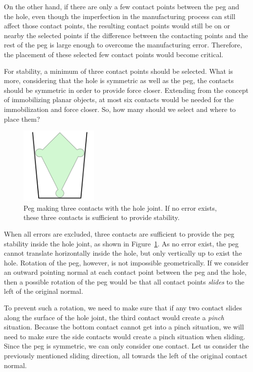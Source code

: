 \documentclass[11pt, twocolumn]{article}
\begin{document}
On the other hand, if there are only a few contact points between the peg and the hole, even though the imperfection in the manufacturing process can still affect those contact points, the resulting contact points would still be on or nearby the selected points if the difference between the contacting points and the rest of the peg is large enough to overcome the manufacturing error. Therefore, the placement of these selected few contact points would become critical. 

For stability, a minimum of three contact points should be selected. What is more, considering that the hole is symmetric as well as the peg, the contacts should be symmetric in order to provide force closer. Extending from the concept of immobilizing planar objects, at most six contacts would be needed for the immobilization and force closer. So, how many should we select and where to place them? 

\begin{figure}
\begin{center}
\includegraphics[width=1.5in]{figures/three_contact.png}
\end{center}
\caption{Peg making three contacts with the hole joint. If no error exists, these three contacts is sufficient to provide stability. }
\label{fig:three_contact}
\end{figure}


When all errors are excluded, three contacts are sufficient to provide the peg stability inside the hole joint, as shown in Figure~\ref{fig:three_contact}. As no error exist, the peg cannot translate horizontally inside the hole, but only vertically up to exist the hole. Rotation of the peg, however, is not impossible geometrically. If we consider an outward pointing normal at each contact point between the peg and the hole, then a possible rotation of the peg would be that all contact points {\em slides} to the left of the original normal. 

To prevent such a rotation, we need to make sure that if any two contact slides along the surface of the hole joint, the third contact would create a {\em pinch} situation. Because the bottom contact cannot get into a pinch situation, we will need to make sure the side contacts would create a pinch situation when sliding. Since the peg is symmetric, we can only consider one contact. Let us consider the previously mentioned sliding direction, all towards the left of the original contact normal. 
\end{document}
